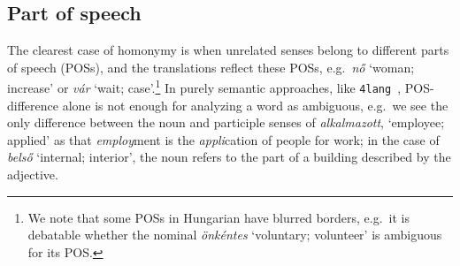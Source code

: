 \documentclass[11pt]{article}
\newcommand{\fl}{\texttt{4lang}}
\newcommand{\todo}[1]{}
\begin{document}
\begin{table*}
\begin{tabular}{llll}
    \bottomrule
  \end{tabular}
   \caption{
     \emph{covg} denotes coverage of the NN@1 translations over all gold
     translations.  
  }
  \label{tab:alkoto} \end{table*}

\subsection{Part of speech}

The clearest case of homonymy is when unrelated senses belong to different
parts of speech (POSs), and the translations reflect these POSs, e.g.~\emph{nő}
`woman; increase' or \emph{vár} \todo{update examples} `wait;
case'.\footnote{We note that some POSs in Hungarian have blurred borders,
e.g.~it is debatable whether the nominal \emph{önkéntes} `voluntary; volunteer'
is ambiguous for its POS.} In purely semantic approaches, like
\fl~\citep{Kornai:2017,Kornai:2015a}, POS-difference alone is not enough for
analyzing a word as ambiguous, e.g.~we see the only difference between the noun
and participle senses of \emph{alkalmazott}, `employee; applied' as that
\emph{employ}ment is the \emph{appli}cation of people for work; in the case of
\emph{belső} `internal; interior', the noun refers to the part of a building
described by the adjective.
\end{document}
